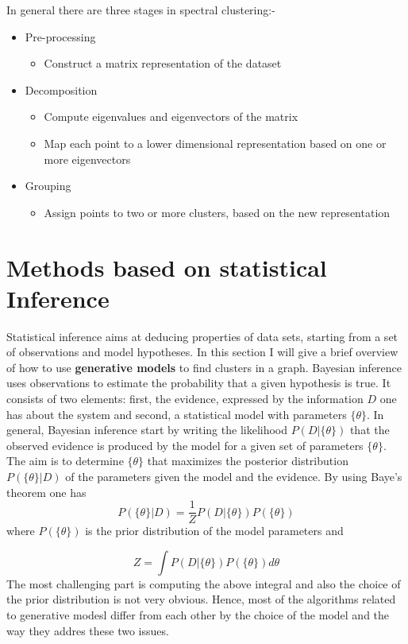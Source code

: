 \documentclass[letterpaper]{article}
\begin{document}
In general there are three stages in spectral clustering:-
\begin{itemize}
\item Pre-processing
\begin{itemize}
\item Construct a matrix representation of the dataset
\end{itemize}
\item Decomposition
\begin{itemize}
\item Compute eigenvalues and eigenvectors of the matrix
\item Map each point to a lower dimensional representation based on one or more
eigenvectors
\end{itemize}
\item Grouping 
\begin{itemize}
\item Assign points to two or more clusters, based on the new representation
\end{itemize}
\end{itemize}



\section{Methods based on statistical Inference}
Statistical inference aims at deducing properties of data sets, starting from a
set of observations and model hypotheses. In this section I will give a brief
overview of how to use \textbf{generative models} to find clusters in a graph.
Bayesian inference uses observations to estimate the probability that a given
hypothesis is true.  It consists of two elements: first, the evidence,
expressed by the information $D$ one has about the system and second, a
statistical model with parameters $\{\theta\}$. In general, Bayesian inference
start by writing the likelihood $P(D|\{\theta\})$ that the observed evidence is
produced by the model for a given set of parameters $\{\theta\}$. The aim is to
determine $\{\theta\}$ that maximizes the posterior distribution
$P(\{\theta\}|D)$ of the parameters given the model and the evidence. By using Baye's theorem
one has 
\begin{equation}
P(\{\theta\}|D) = \frac{1}{Z}P(D|\{\theta\}) P(\{\theta\})
\end{equation}
where $P(\{\theta\})$ is the prior distribution of the model parameters and 

\begin{equation}
Z= \int P(D|\{\theta\}) P(\{\theta\}) d\theta
\end{equation}
The most challenging part is computing the above integral and also the choice
of the prior distribution is not very obvious. Hence, most of the algorithms
related to generative modesl differ from each other by the choice of the model
and the way they addres these two issues.
\end{document}
